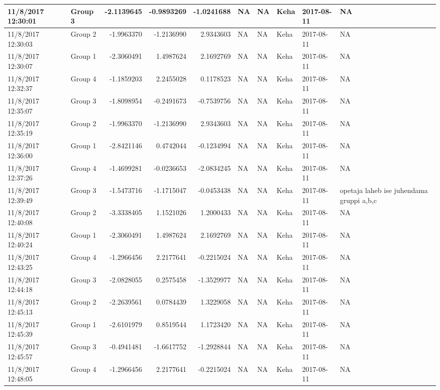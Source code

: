 \documentclass[]{article}
\begin{document}
\begin{tabular}{l|l|r|r|r|l|l|l|l|l}
\hline
11/8/2017 12:30:01 & Group 3 & -2.1139645 & -0.9893269 & -1.0241688 & NA & NA & Keha & 2017-08-11 & NA\\
\hline
11/8/2017 12:30:03 & Group 2 & -1.9963370 & -1.2136990 & 2.9343603 & NA & NA & Keha & 2017-08-11 & NA\\
\hline
11/8/2017 12:30:07 & Group 1 & -2.3060491 & 1.4987624 & 2.1692769 & NA & NA & Keha & 2017-08-11 & NA\\
\hline
11/8/2017 12:32:37 & Group 4 & -1.1859203 & 2.2455028 & 0.1178523 & NA & NA & Keha & 2017-08-11 & NA\\
\hline
11/8/2017 12:35:07 & Group 3 & -1.8098954 & -0.2491673 & -0.7539756 & NA & NA & Keha & 2017-08-11 & NA\\
\hline
11/8/2017 12:35:19 & Group 2 & -1.9963370 & -1.2136990 & 2.9343603 & NA & NA & Keha & 2017-08-11 & NA\\
\hline
11/8/2017 12:36:00 & Group 1 & -2.8421146 & 0.4742044 & -0.1234994 & NA & NA & Keha & 2017-08-11 & NA\\
\hline
11/8/2017 12:37:26 & Group 4 & -1.4699281 & -0.0236653 & -2.0834245 & NA & NA & Keha & 2017-08-11 & NA\\
\hline
11/8/2017 12:39:49 & Group 3 & -1.5473716 & -1.1715047 & -0.0453438 & NA & NA & Keha & 2017-08-11 & opetaja laheb ise juhendama gruppi a,b,c\\
\hline
11/8/2017 12:40:08 & Group 2 & -3.3338405 & 1.1521026 & 1.2000433 & NA & NA & Keha & 2017-08-11 & NA\\
\hline
11/8/2017 12:40:24 & Group 1 & -2.3060491 & 1.4987624 & 2.1692769 & NA & NA & Keha & 2017-08-11 & NA\\
\hline
11/8/2017 12:43:25 & Group 4 & -1.2966456 & 2.2177641 & -0.2215024 & NA & NA & Keha & 2017-08-11 & NA\\
\hline
11/8/2017 12:44:18 & Group 3 & -2.0828055 & 0.2575458 & -1.3529977 & NA & NA & Keha & 2017-08-11 & NA\\
\hline
11/8/2017 12:45:13 & Group 2 & -2.2639561 & 0.0784439 & 1.3229058 & NA & NA & Keha & 2017-08-11 & NA\\
\hline
11/8/2017 12:45:39 & Group 1 & -2.6101979 & 0.8519544 & 1.1723420 & NA & NA & Keha & 2017-08-11 & NA\\
\hline
11/8/2017 12:45:57 & Group 3 & -0.4941481 & -1.6617752 & -1.2928844 & NA & NA & Keha & 2017-08-11 & NA\\
\hline
11/8/2017 12:48:05 & Group 4 & -1.2966456 & 2.2177641 & -0.2215024 & NA & NA & Keha & 2017-08-11 & NA\\

\end{tabular}
\end{document}

